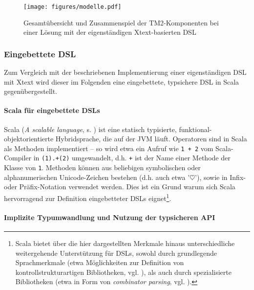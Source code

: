 \documentclass[abstracton, 12pt]{scrartcl}
\begin{document}
\begin{figure}
\begin{center}
  \texttt{[image: figures/modelle.pdf]}
  \caption[Gesamtübersicht]{Gesamtübersicht und Zusammenspiel der TM2-Komponenten bei einer Lösung mit der eigenständigen Xtext-basierten DSL}
  \label{modelle}
\end{center}
\end{figure}

\subsubsection{Eingebettete DSL} \label{werk-dsl-intern}  

Zum Vergleich mit der beschriebenen Implementierung einer eigenständigen DSL mit Xtext wird dieser im Folgenden eine eingebettete, typsichere DSL in Scala gegenübergestellt.

\paragraph{Scala für eingebettete DSLs}

Scala (\emph{A scalable language}, s. \citealt{OderskyEtAl2008}) ist eine statisch typisierte, funktional-objektorientierte Hybridsprache, die auf der JVM läuft. Operatoren sind in Scala als Methoden implementiert -- so wird etwa ein Aufruf wie \lstinline!1 + 2! vom Scala-Compiler in \lstinline!(1).+(2)! umgewandelt, d.h.  \lstinline!+! ist der Name einer Methode der Klasse von  \lstinline!1!. Methoden können aus beliebigen symbolischen oder alphanumerischen Unicode-Zeichen bestehen (d.h. auch etwa '$\heartsuit$'), sowie in Infix- oder Präfix-Notation verwendet werden. Dies ist ein Grund warum sich Scala hervorragend zur Definition eingebetteter DSLs eignet\footnote{Scala bietet über die hier dargestellten Merkmale hinaus unterschiedliche weitergehende Unterstützung für DSLs, sowohl durch grundlegende Sprachmerkmale (etwa Möglichkeiten zur Definition von kontrollstrukturartigen Bibliotheken, vgl. \citealt[161ff.]{OderskyEtAl2008}), als auch durch spezialisierte Bibliotheken (etwa in Form von \emph{combinator parsing}, vgl. \citealt[619ff.]{OderskyEtAl2008}).}.

\paragraph{Implizite Typumwandlung und Nutzung der typsicheren API}
\end{document}
